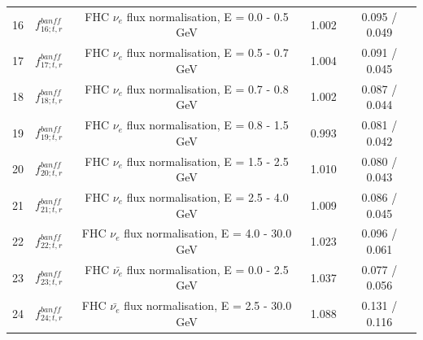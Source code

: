 \begin{tabular} { | c | c | c | c | c |  }
16 & $f_{16; t, r}^{banff}$ & FHC $\nu_e$ flux normalisation, E = 0.0 - 0.5 GeV & 1.002 & 0.095 / 0.049\\ 
17 & $f_{17; t, r}^{banff}$ & FHC $\nu_e$ flux normalisation, E = 0.5 - 0.7 GeV & 1.004 & 0.091 / 0.045\\ 
18 & $f_{18; t, r}^{banff}$ & FHC $\nu_e$ flux normalisation, E = 0.7 - 0.8 GeV & 1.002 & 0.087 / 0.044\\ 
19 & $f_{19; t, r}^{banff}$ & FHC $\nu_e$ flux normalisation, E = 0.8 - 1.5 GeV & 0.993 & 0.081 / 0.042\\ 
20 & $f_{20; t, r}^{banff}$ & FHC $\nu_e$ flux normalisation, E = 1.5 - 2.5 GeV & 1.010 & 0.080 / 0.043\\ 
21 & $f_{21; t, r}^{banff}$ & FHC $\nu_e$ flux normalisation, E = 2.5 - 4.0 GeV & 1.009 & 0.086 / 0.045\\ 
22 & $f_{22; t, r}^{banff}$ & FHC $\nu_e$ flux normalisation, E = 4.0 - 30.0 GeV & 1.023 & 0.096 / 0.061\\ 
23 & $f_{23; t, r}^{banff}$ & FHC $\bar{\nu_e}$ flux normalisation, E = 0.0 - 2.5 GeV & 1.037 & 0.077 / 0.056\\ 
24 & $f_{24; t, r}^{banff}$ & FHC $\bar{\nu_e}$ flux normalisation, E = 2.5 - 30.0 GeV & 1.088 & 0.131 / 0.116\\ 

\hline

\end{tabular}